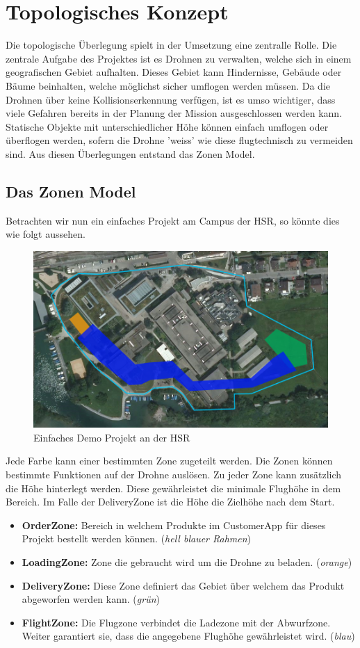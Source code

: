 \section{Topologisches Konzept}
Die topologische Überlegung spielt in der Umsetzung eine zentralle Rolle. Die zentrale Aufgabe des Projektes ist es Drohnen zu verwalten, welche sich in einem geografischen Gebiet aufhalten. Dieses Gebiet kann Hindernisse, Gebäude oder Bäume beinhalten, welche möglichst sicher umflogen werden müssen. Da die Drohnen über keine Kollisionserkennung verfügen, ist es umso wichtiger, dass viele Gefahren bereits in der Planung der Mission ausgeschlossen werden kann. Statische Objekte mit unterschiedlicher Höhe können einfach umflogen oder überflogen werden, sofern die Drohne 'weiss' wie diese flugtechnisch zu vermeiden sind. Aus diesen Überlegungen entstand das Zonen Model.
\subsection{Das Zonen Model}

Betrachten wir nun ein einfaches Projekt am Campus der HSR, so könnte dies wie folgt aussehen. \\
\begin{figure}[h]
	\includegraphics[width=1.0\textwidth]{images/routing/simpleProject_example.png}
	\caption{Einfaches Demo Projekt an der HSR}
	\label{fig:demo-project}
\end{figure}
Jede Farbe kann einer bestimmten Zone zugeteilt werden. Die Zonen können bestimmte Funktionen auf der Drohne auslösen. Zu jeder Zone kann zusätzlich die Höhe hinterlegt werden. Diese gewährleistet die minimale Flughöhe in dem Bereich. Im Falle der DeliveryZone ist die Höhe die Zielhöhe nach dem Start.
\begin{itemize}
	\item{\textbf{OrderZone:} Bereich in welchem Produkte im CustomerApp für dieses Projekt bestellt werden können.  (\textit{hell blauer Rahmen})}
	\item{\textbf{LoadingZone:} Zone die gebraucht wird um die Drohne zu beladen. (\textit{orange})}
	\item{\textbf{DeliveryZone:} Diese Zone definiert das Gebiet über welchem das Produkt abgeworfen werden kann. (\textit{grün})}
	\item{\textbf{FlightZone:} Die Flugzone verbindet die Ladezone mit der Abwurfzone. Weiter garantiert sie, dass die angegebene Flughöhe gewährleistet wird. (\textit{blau})}
\end{itemize}
